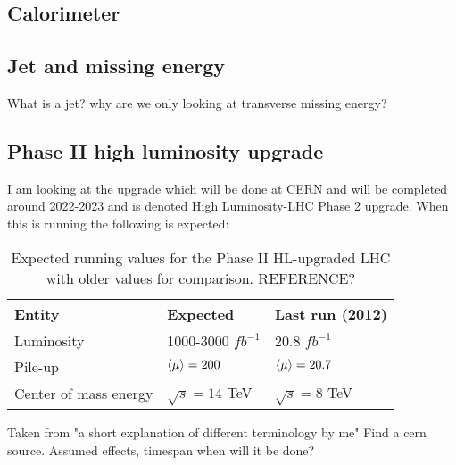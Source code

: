 \subsection{Calorimeter}
\subsection{Jet and missing energy}
What is a jet? why are we only looking at transverse missing energy? 
\subsection{Phase II high luminosity upgrade}
I am looking at the upgrade which will be done at CERN and will be completed around 2022-2023 and is denoted High Luminosity-LHC Phase 2 upgrade. When this is running the following is expected:
\begin{table}[H]
\begin{center}
    \begin{tabular}{ | l | l | l |}
    \hline
    Entity & Expected & Last run (2012) \\ \hline
  	Luminosity & 1000-3000 $fb^{-1}$ & 20.8 $fb^{-1}$ \\ \hline
  	Pile-up & $\left<\mu\right>=200$ & $\left<\mu\right>=20.7$ \\ \hline
  	Center of mass energy & $\sqrt{s}=14$ TeV &  $\sqrt{s}=8$ TeV \\ \hline
  	\end{tabular}
  	
  	\caption{Expected running values for the Phase II HL-upgraded LHC with older values for comparison. REFERENCE?}
  	\label{tab:expectvalues}
  	\end{center}
    \end{table}
Taken from "a short explanation of different terminology by me" Find a cern source.
Assumed effects, timespan when will it be done?
